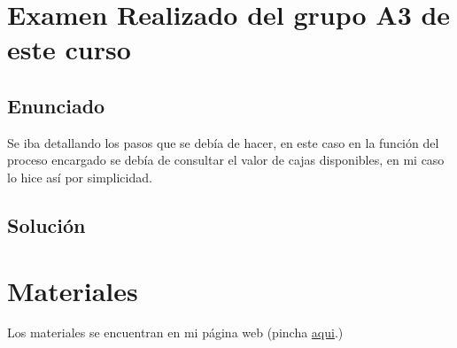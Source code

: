 \documentclass[a4paper,12pt]{article}
\begin{document}
\section{Examen Realizado del grupo A3 de este curso}
\subsection{Enunciado}
Se iba detallando los pasos que se debía de hacer, en este caso en la función del proceso encargado se debía de consultar el valor de cajas disponibles, en mi caso lo hice así por simplicidad.
\subsection{Solución}


\section{Materiales}
Los materiales se encuentran en mi página web (pincha \href{https://github.com/ElblogdeIsmael/ElblogdeIsmael.github.io/tree/main/Asignaturas/Tercer%20A%C3%B1o/SCD/Examenes/SegundoParcial/ETSIIT/code}{aqui}.)
\end{document}
